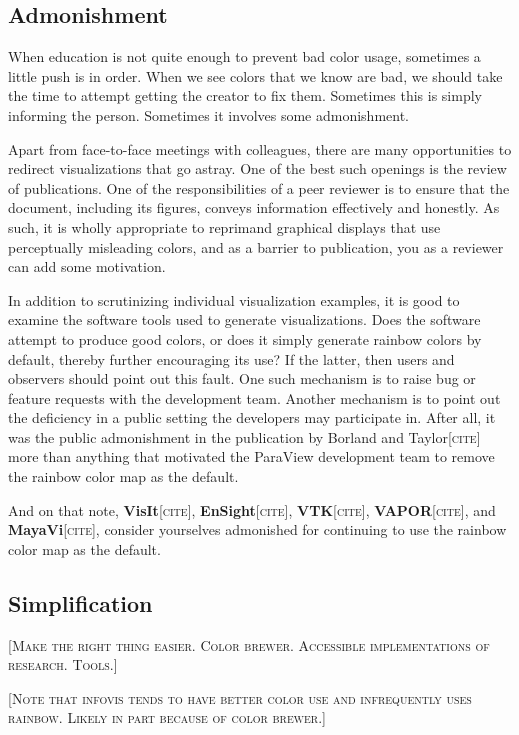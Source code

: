\documentclass[letterpaper,twocolumn,fleqn]{article}
\newcommand{\fix}[1]{{\color{red}\textsc{[#1]}}}
\begin{document}
\subsection{Admonishment}

\noindent
When education is not quite enough to prevent bad color usage, sometimes a
little push is in order. When we see colors that we know are bad, we should
take the time to attempt getting the creator to fix them. Sometimes this is
simply informing the person. Sometimes it involves some admonishment.

Apart from face-to-face meetings with colleagues, there are many
opportunities to redirect visualizations that go astray. One of the best
such openings is the review of publications. One of the responsibilities of
a peer reviewer is to ensure that the document, including its figures,
conveys information effectively and honestly. As such, it is wholly
appropriate to reprimand graphical displays that use perceptually
misleading colors, and as a barrier to publication, you as a reviewer can
add some motivation.

In addition to scrutinizing individual visualization examples, it is good
to examine the software tools used to generate visualizations. Does the
software attempt to produce good colors, or does it simply generate rainbow
colors by default, thereby further encouraging its use? If the latter, then
users and observers should point out this fault. One such mechanism is to
raise bug or feature requests with the development team. Another mechanism
is to point out the deficiency in a public setting the developers may
participate in. After all, it was the public admonishment in the
publication by Borland and Taylor\fix{cite} more than anything that
motivated the ParaView development team to remove the rainbow color map as
the default.

And on that note, \textbf{VisIt}\fix{cite}, \textbf{EnSight}\fix{cite},
\textbf{VTK}\fix{cite}, \textbf{VAPOR}\fix{cite}, and
\textbf{MayaVi}\fix{cite}, consider yourselves admonished for continuing to
use the rainbow color map as the default.

\subsection{Simplification}

\fix{Make the right thing easier. Color brewer. Accessible implementations
  of research. Tools.}

\fix{Note that infovis tends to have better color use and infrequently uses
  rainbow. Likely in part because of color brewer.}
\end{document}
